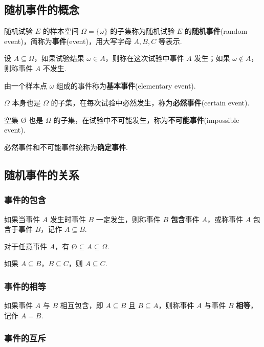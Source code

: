 \subsection{随机事件的概念}

随机试验 $E$ 的样本空间 $\varOmega = \{ \omega \}$ 的子集称为随机试验 $E$ 的\textbf{随机事件}(random event)，简称为\textbf{事件}(event)，用大写字母 $A,B,C$ 等表示.

设 $A \subseteq \varOmega$，如果试验结果 $\omega \in A$，则称在这次试验中事件 $A$ 发生；如果 $\omega \notin A$，则称事件 $A$ 不发生.

由一个样本点 $\omega$ 组成的事件称为\textbf{基本事件}(elementary event).

$\varOmega$ 本身也是 $\varOmega$ 的子集，在每次试验中必然发生，称为\textbf{必然事件}(certain event).

空集 $\text{\O}$ 也是 $\varOmega$ 的子集，在试验中不可能发生，称为\textbf{不可能事件}(impossible event).

必然事件和不可能事件统称为\textbf{确定事件}.

\subsection{随机事件的关系}

\subsubsection{事件的包含}

如果当事件 $A$ 发生时事件 $B$ 一定发生，则称事件 $B$ \textbf{包含}事件 $A$，或称事件 $A$ 包含于事件 $B$，记作 $A \subseteq B$.

\begin{property}
    \indent 对于任意事件 $A$，有 $\text{\O} \subseteq A \subseteq \varOmega$.
\end{property}

\begin{property}
    \indent 如果 $A \subseteq B$，$B \subseteq C$，则 $A\subseteq C$.
\end{property}

\subsubsection{事件的相等}

如果事件 $A$ 与 $B$ 相互包含，即 $A \subseteq B$ 且 $B \subseteq A$，则称事件 $A$ 与事件 $B$ \textbf{相等}，记作 $A=B$.

\subsubsection{事件的互斥}

